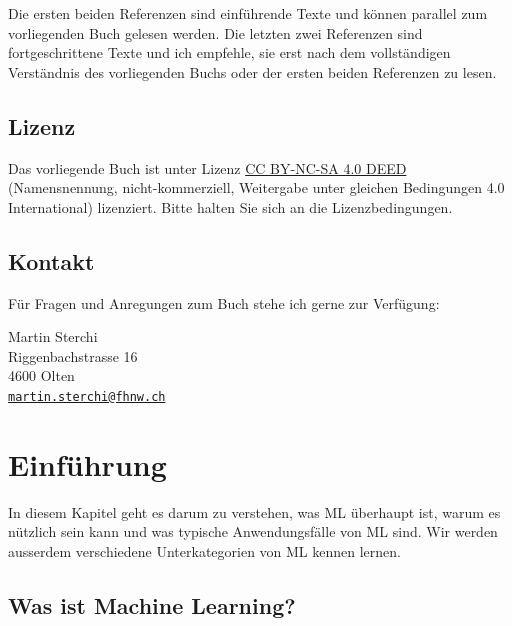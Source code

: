 \documentclass[
]{book}
\begin{document}
Die ersten beiden Referenzen sind einführende Texte und können parallel zum vorliegenden Buch gelesen werden. Die letzten zwei Referenzen sind fortgeschrittene Texte und ich empfehle, sie erst nach dem vollständigen Verständnis des vorliegenden Buchs oder der ersten beiden Referenzen zu lesen.

\hypertarget{lizenz}{%
\section*{Lizenz}\label{lizenz}}

Das vorliegende Buch ist unter Lizenz \href{https://creativecommons.org/licenses/by-nc-sa/4.0/deed.de}{CC BY-NC-SA 4.0 DEED} (Namensnennung, nicht-kommerziell, Weitergabe unter gleichen Bedingungen 4.0 International) lizenziert. Bitte halten Sie sich an die Lizenzbedingungen.

\hypertarget{kontakt}{%
\section*{Kontakt}\label{kontakt}}

Für Fragen und Anregungen zum Buch stehe ich gerne zur Verfügung:

Martin Sterchi\\
Riggenbachstrasse 16\\
4600 Olten\\
\href{mailto:martin.sterchi@fhnw.ch}{\nolinkurl{martin.sterchi@fhnw.ch}}

\hypertarget{intro}{%
\chapter{Einführung}\label{intro}}

In diesem Kapitel geht es darum zu verstehen, was ML überhaupt ist, warum es nützlich sein kann und was typische Anwendungsfälle von ML sind. Wir werden ausserdem verschiedene Unterkategorien von ML kennen lernen.

\hypertarget{was-ist-machine-learning}{%
\section{Was ist Machine Learning?}\label{was-ist-machine-learning}}
\end{document}

